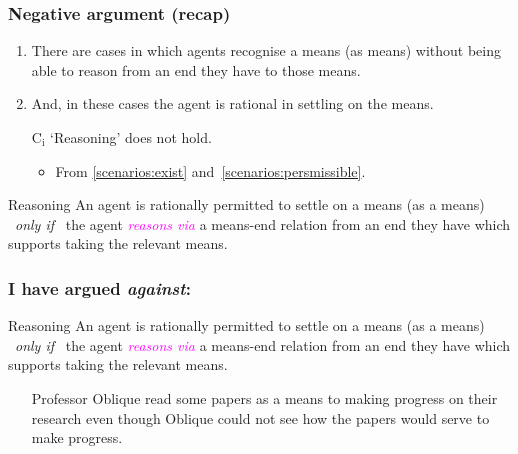 \documentclass[noamssymb, compress, handout]{beamer} %
\newcommand{\hand}{\ding{43}}
\newcommand{\hozlinedash}[0]{%
  \noindent\hdashrule[0.5ex][c]{\textwidth}{.1pt}{2.5pt}
}
\begin{document}
\begin{frame}
  \frametitle{Negative argument (recap)}

  \begin{enumerate}
  \item\label{scenarios:exist} There are cases in which agents recognise a means (as means) without being able to reason from an end they have to those means.
  \item\label{scenarios:persmissible} And, in these cases the agent is rational in settling on the means.

  \item[C\(_{\text{i}}\)] `Reasoning' does not hold.
    \begin{itemize}
    \item From \ref{scenarios:exist} and~\ref{scenarios:persmissible}.
    \end{itemize}
  \end{enumerate}

  \hozlinedash
  {\footnotesize
    \begin{block}{Reasoning}
      An agent is rationally permitted to settle on a means (as a means)
      \newline
      \mbox{ }\hfill\emph{only if}\hfill\mbox{ }
      \newline
      the agent \textcolor{fuchsia}{\emph{reasons via}}  a means-end relation from an end they have which supports taking the relevant means.
    \end{block}
  }

\end{frame}

\begin{frame}
  \frametitle{I have argued \emph{against}:}

  \begin{block}{Reasoning}
    An agent is rationally permitted to settle on a means (as a means)
    \newline
    \mbox{ }\hfill\emph{only if}\hfill\mbox{ }
    \newline
    the agent \textcolor{fuchsia}{\emph{reasons via}} a means-end relation from an end they have which supports taking the relevant means.
  \end{block}

  \begin{itemize}
  \item[\hand] Professor Oblique read some papers as a means to making progress on their research even though Oblique could not see how the papers would serve to make progress.
  \end{itemize}
\end{frame}
\end{document}
